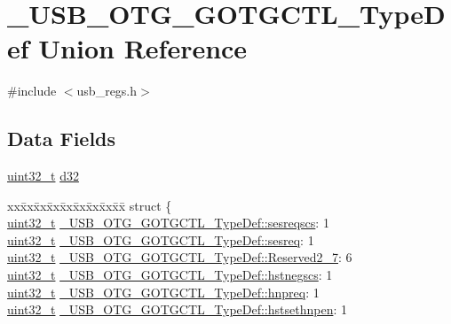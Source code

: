 \hypertarget{union___u_s_b___o_t_g___g_o_t_g_c_t_l___type_def}{\section{\-\_\-\-U\-S\-B\-\_\-\-O\-T\-G\-\_\-\-G\-O\-T\-G\-C\-T\-L\-\_\-\-Type\-Def Union Reference}
\label{union___u_s_b___o_t_g___g_o_t_g_c_t_l___type_def}
}


{\ttfamily \#include $<$usb\-\_\-regs.\-h$>$}

\subsection*{Data Fields}
\begin{DoxyCompactItemize}
\item 
\hyperlink{stdint_8h_a435d1572bf3f880d55459d9805097f62}{uint32\-\_\-t} \hyperlink{group___u_s_b___o_t_g___d_r_i_v_e_r_gaf6bba95362f08d9514ab8096cb8cf6a7}{d32}
\item 
\begin{tabbing}
xx\=xx\=xx\=xx\=xx\=xx\=xx\=xx\=xx\=\kill
struct \{\\
\>\hyperlink{stdint_8h_a435d1572bf3f880d55459d9805097f62}{uint32\_t} \hyperlink{group___u_s_b___o_t_g___d_r_i_v_e_r_gab0d6bf182833ffbcb57a537824c74db0}{\_USB\_OTG\_GOTGCTL\_TypeDef::sesreqscs}: 1\\
\>\hyperlink{stdint_8h_a435d1572bf3f880d55459d9805097f62}{uint32\_t} \hyperlink{group___u_s_b___o_t_g___d_r_i_v_e_r_gaae14bcb1524970983dc360d7e3d79fea}{\_USB\_OTG\_GOTGCTL\_TypeDef::sesreq}: 1\\
\>\hyperlink{stdint_8h_a435d1572bf3f880d55459d9805097f62}{uint32\_t} \hyperlink{group___u_s_b___o_t_g___d_r_i_v_e_r_ga9821b352087a7b65db3080c50475eba8}{\_USB\_OTG\_GOTGCTL\_TypeDef::Reserved2\_7}: 6\\
\>\hyperlink{stdint_8h_a435d1572bf3f880d55459d9805097f62}{uint32\_t} \hyperlink{group___u_s_b___o_t_g___d_r_i_v_e_r_gab946d22c3ce448cb5400c80a67741c7d}{\_USB\_OTG\_GOTGCTL\_TypeDef::hstnegscs}: 1\\
\>\hyperlink{stdint_8h_a435d1572bf3f880d55459d9805097f62}{uint32\_t} \hyperlink{group___u_s_b___o_t_g___d_r_i_v_e_r_gaf3e9c6ede6612d1d7229ccc6d201a595}{\_USB\_OTG\_GOTGCTL\_TypeDef::hnpreq}: 1\\
\>\hyperlink{stdint_8h_a435d1572bf3f880d55459d9805097f62}{uint32\_t} \hyperlink{group___u_s_b___o_t_g___d_r_i_v_e_r_gaf0bba72b67cdc4421da620a2206119bb}{\_USB\_OTG\_GOTGCTL\_TypeDef::hstsethnpen}: 1\\

\end{tabbing}
\end{DoxyCompactItemize}
